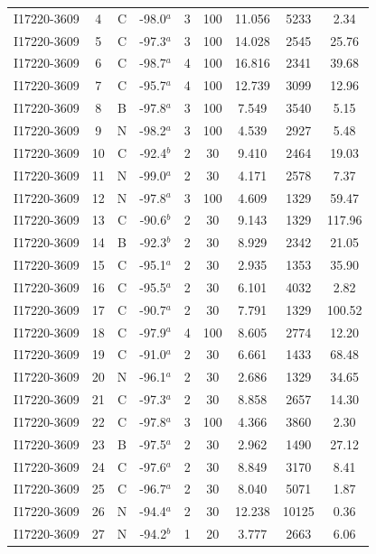 \begin{table}
\begin{tabular}{ccccccccc}
I17220-3609 & 4 & C & -98.0$^{a}$ & 3 & 100 & 11.056 & 5233 & 2.34 \\
I17220-3609 & 5 & C & -97.3$^{a}$ & 3 & 100 & 14.028 & 2545 & 25.76 \\
I17220-3609 & 6 & C & -98.7$^{a}$ & 4 & 100 & 16.816 & 2341 & 39.68 \\
I17220-3609 & 7 & C & -95.7$^{a}$ & 4 & 100 & 12.739 & 3099 & 12.96 \\
I17220-3609 & 8 & B & -97.8$^{a}$ & 3 & 100 & 7.549 & 3540 & 5.15 \\
I17220-3609 & 9 & N & -98.2$^{a}$ & 3 & 100 & 4.539 & 2927 & 5.48 \\
I17220-3609 & 10 & C & -92.4$^{b}$ & 2 & 30 & 9.410 & 2464 & 19.03 \\
I17220-3609 & 11 & N & -99.0$^{a}$ & 2 & 30 & 4.171 & 2578 & 7.37 \\
I17220-3609 & 12 & N & -97.8$^{a}$ & 3 & 100 & 4.609 & 1329 & 59.47 \\
I17220-3609 & 13 & C & -90.6$^{b}$ & 2 & 30 & 9.143 & 1329 & 117.96 \\
I17220-3609 & 14 & B & -92.3$^{b}$ & 2 & 30 & 8.929 & 2342 & 21.05 \\
I17220-3609 & 15 & C & -95.1$^{a}$ & 2 & 30 & 2.935 & 1353 & 35.90 \\
I17220-3609 & 16 & C & -95.5$^{a}$ & 2 & 30 & 6.101 & 4032 & 2.82 \\
I17220-3609 & 17 & C & -90.7$^{a}$ & 2 & 30 & 7.791 & 1329 & 100.52 \\
I17220-3609 & 18 & C & -97.9$^{a}$ & 4 & 100 & 8.605 & 2774 & 12.20 \\
I17220-3609 & 19 & C & -91.0$^{a}$ & 2 & 30 & 6.661 & 1433 & 68.48 \\
I17220-3609 & 20 & N & -96.1$^{a}$ & 2 & 30 & 2.686 & 1329 & 34.65 \\
I17220-3609 & 21 & C & -97.3$^{a}$ & 2 & 30 & 8.858 & 2657 & 14.30 \\
I17220-3609 & 22 & C & -97.8$^{a}$ & 3 & 100 & 4.366 & 3860 & 2.30 \\
I17220-3609 & 23 & B & -97.5$^{a}$ & 2 & 30 & 2.962 & 1490 & 27.12 \\
I17220-3609 & 24 & C & -97.6$^{a}$ & 2 & 30 & 8.849 & 3170 & 8.41 \\
I17220-3609 & 25 & C & -96.7$^{a}$ & 2 & 30 & 8.040 & 5071 & 1.87 \\
I17220-3609 & 26 & N & -94.4$^{a}$ & 2 & 30 & 12.238 & 10125 & 0.36 \\
I17220-3609 & 27 & N & -94.2$^{b}$ & 1 & 20 & 3.777 & 2663 & 6.06 \\

\end{tabular}
\end{table}
